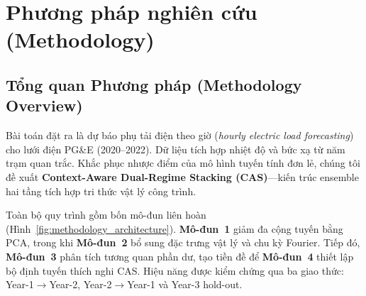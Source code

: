 \section{Phương pháp nghiên cứu (Methodology)}
\label{sec:methodology}

\subsection{Tổng quan Phương pháp (Methodology Overview)}
\label{subsec:methodology_overview}

Bài toán đặt ra là dự báo phụ tải điện theo giờ (\textit{hourly electric load forecasting}) cho lưới điện PG\&E (2020--2022). Dữ liệu tích hợp nhiệt độ và bức xạ từ năm trạm quan trắc. Khắc phục nhược điểm của mô hình tuyến tính đơn lẻ, chúng tôi đề xuất \textbf{Context-Aware Dual-Regime Stacking (CAS)}---kiến trúc ensemble hai tầng tích hợp tri thức vật lý công trình.

Toàn bộ quy trình gồm bốn mô-đun liên hoàn (Hình~\ref{fig:methodology_architecture}). \textbf{Mô-đun~1} giảm đa cộng tuyến bằng PCA, trong khi \textbf{Mô-đun~2} bổ sung đặc trưng vật lý và chu kỳ Fourier. Tiếp đó, \textbf{Mô-đun~3} phân tích tương quan phần dư, tạo tiền đề để \textbf{Mô-đun~4} thiết lập bộ định tuyến thích nghi CAS. Hiệu năng được kiểm chứng qua ba giao thức: Year-1$\to$Year-2, Year-2$\to$Year-1 và Year-3 hold-out.

